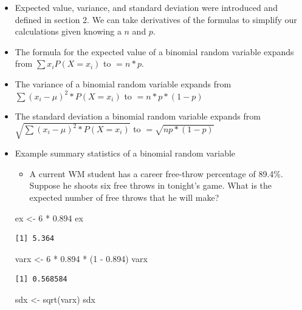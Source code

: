 \documentclass[
  letterpaper,
  DIV=11,
  numbers=noendperiod]{scrreprt}
\newenvironment{Shaded}{\begin{snugshade}}{\end{snugshade}}
\newcommand{\DecValTok}[1]{\textcolor[rgb]{0.68,0.00,0.00}{#1}}
\newcommand{\FloatTok}[1]{\textcolor[rgb]{0.68,0.00,0.00}{#1}}
\newcommand{\FunctionTok}[1]{\textcolor[rgb]{0.28,0.35,0.67}{#1}}
\newcommand{\NormalTok}[1]{\textcolor[rgb]{0.00,0.23,0.31}{#1}}
\newcommand{\OtherTok}[1]{\textcolor[rgb]{0.00,0.23,0.31}{#1}}
\newcommand{\SpecialCharTok}[1]{\textcolor[rgb]{0.37,0.37,0.37}{#1}}
\providecommand{\tightlist}{%
  \setlength{\itemsep}{0pt}\setlength{\parskip}{0pt}}\usepackage{longtable,booktabs,array}
\begin{document}
\begin{itemize}
\item
  Expected value, variance, and standard deviation were introduced and
  defined in section 2. We can take derivatives of the formulas to
  simplify our calculations given knowing a \(n\) and \(p\).
\item
  The formula for the expected value of a binomial random variable
  expands from \(\sum{x_iP(X=x_i)}\) to \(= n*p\).
\item
  The variance of a binomial random variable expands from
  \(\sum{(x_i-\mu)^2*P(X=x_i)}\) to \(= n*p*(1-p)\)
\item
  The standard deviation a binomial random variable expands from
  \(\sqrt{\sum{(x_i-\mu)^2*P(X=x_i)}}\) to \(= \sqrt{np*(1-p)}\)
\item
  Example summary statistics of a binomial random variable

  \begin{itemize}
  \tightlist
  \item
    A current WM student has a career free-throw percentage of 89.4\%.
    Suppose he shoots six free throws in tonight's game. What is the
    expected number of free throws that he will make?
  \end{itemize}

\begin{Shaded}
\begin{Highlighting}[]
\NormalTok{ex }\OtherTok{\textless{}{-}} \DecValTok{6} \SpecialCharTok{*} \FloatTok{0.894}
\NormalTok{ex}
\end{Highlighting}
\end{Shaded}

\begin{verbatim}
[1] 5.364
\end{verbatim}

\begin{Shaded}
\begin{Highlighting}[]
\NormalTok{varx }\OtherTok{\textless{}{-}} \DecValTok{6} \SpecialCharTok{*} \FloatTok{0.894} \SpecialCharTok{*}\NormalTok{ (}\DecValTok{1} \SpecialCharTok{{-}} \FloatTok{0.894}\NormalTok{)}
\NormalTok{varx}
\end{Highlighting}
\end{Shaded}

\begin{verbatim}
[1] 0.568584
\end{verbatim}

\begin{Shaded}
\begin{Highlighting}[]
\NormalTok{sdx }\OtherTok{\textless{}{-}} \FunctionTok{sqrt}\NormalTok{(varx)}
\NormalTok{sdx}
\end{Highlighting}
\end{Shaded}


\end{itemize}
\end{document}

